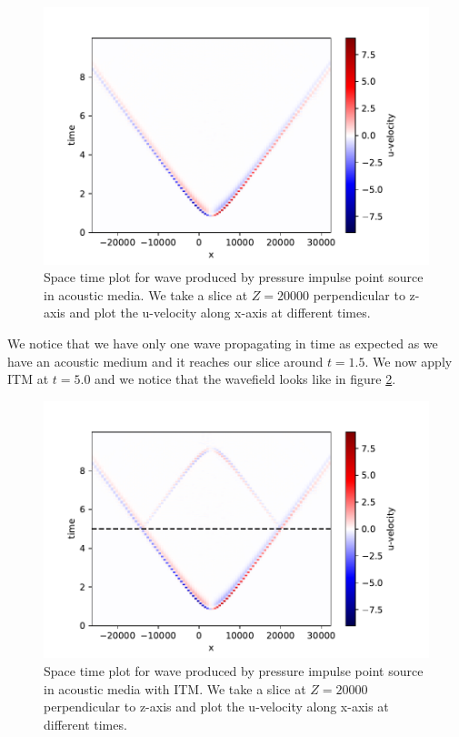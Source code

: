 \begin{figure}
    \centering
    \includegraphics[width=0.75\linewidth]{figures/pressureimpulsewave-noITM.pdf}
    \caption{Space time plot for wave produced by pressure impulse point source in acoustic media. We take a slice at $Z=20000$ perpendicular to z-axis and plot the
    u-velocity along x-axis at different times.}
    \label{fig:space-timeplot-pressurenoITM}
\end{figure}

We notice that we have only one wave propagating in time as expected as we have an acoustic medium and it reaches our slice around $t=1.5$. We now apply \ac{ITM} at $t=5.0$ and we notice that the wavefield looks like in figure \ref{fig:space-timeplot-pressureITM}.

\begin{figure}
    \centering
    \includegraphics[width=0.75\linewidth]{figures/pressure-impulse-ITM.pdf}
    \caption{Space time plot for wave produced by pressure impulse point source in acoustic media with \ac{ITM}. We take a slice at $Z=20000$ perpendicular to z-axis and plot the
    u-velocity along x-axis at different times.}
    \label{fig:space-timeplot-pressureITM}
\end{figure}

